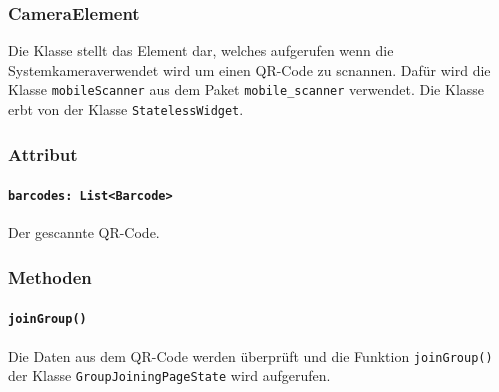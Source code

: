\documentclass{entwurfsheft}
\begin{document}
    \subsubsection*{CameraElement}
        Die Klasse stellt das Element dar, welches aufgerufen wenn die Systemkameraverwendet wird um einen QR-Code zu scnannen. Dafür wird die Klasse \texttt{mobileScanner} aus dem Paket \texttt{mobile\_scanner} verwendet. Die Klasse erbt von der Klasse \texttt{StatelessWidget}.
        \subsubsection*{Attribut}
            \paragraph*{\texttt{barcodes: List<Barcode>}} Der gescannte QR-Code.

        \subsubsection*{Methoden}
            \paragraph*{\texttt{joinGroup()}} Die Daten aus dem QR-Code werden überprüft und die Funktion \texttt{joinGroup()} der Klasse \texttt{GroupJoiningPageState} wird aufgerufen.
    
\end{document}
